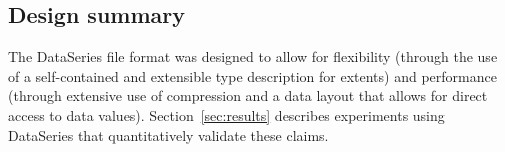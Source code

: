 \subsection{Design summary}

The DataSeries file format was designed to allow for flexibility
(through the use of a self-contained and extensible type description
for extents) and performance (through extensive use of compression and
a data layout that allows for direct access to data values). 
Section~\ref{sec:results} describes experiments using
DataSeries that quantitatively validate these claims.
